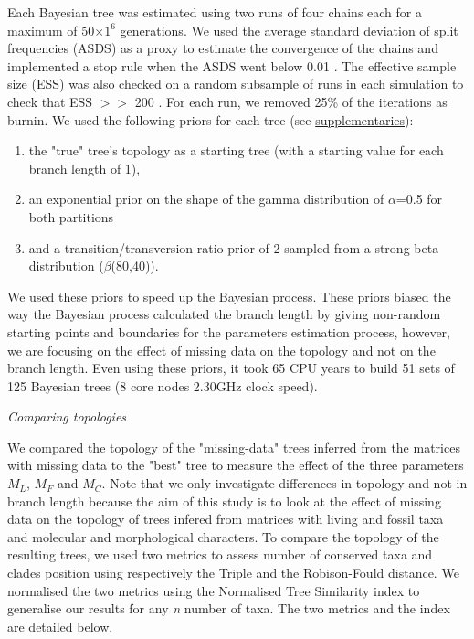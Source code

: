 \documentclass[12pt,letterpaper]{article}
\renewcommand{\subsection}[1]{%
\bigskip
\begin{center}
\begin{large}
\normalfont\itshape #1
\end{large}
\end{center}}
\begin{document}
Each Bayesian tree was estimated using two runs of four chains each for a maximum of 50$\times$$1^6$ generations.
We used the average standard deviation of split frequencies (ASDS) as a proxy to estimate the convergence of the chains and implemented a stop rule when the ASDS went below 0.01 \citep{Ronquist2012mrbayes}.
The effective sample size (ESS) was also checked on a random subsample of runs in each simulation to check that ESS $>>$ 200 \citep{drummond2006ess}.
For each run, we removed 25\% of the iterations as burnin. We used the following priors for each tree (see \hyperref[supplementaries]{supplementaries}):
\begin{enumerate}
\item
the "true" tree’s topology as a starting tree (with a starting value for each branch length of 1),
\item
an exponential prior on the shape of the gamma distribution of $\alpha$=0.5 for both partitions
\item
and a transition/transversion ratio prior of 2 sampled from a strong beta distribution ($\beta$(80,40)).
\end{enumerate}

We used these priors to speed up the Bayesian process.
These priors biased the way the Bayesian process calculated the branch length by giving non-random starting points and boundaries for the parameters estimation process, however, we are focusing on the effect of missing data on the topology and not on the branch length.
Even using these priors, it took 65 CPU years to build 51 sets of 125 Bayesian trees (8 core nodes 2.30GHz clock speed).

\subsection{Comparing topologies}
We compared the topology of the "missing-data" trees inferred from the matrices with missing data to the "best" tree to measure the effect of the three parameters $M_{L}$, $M_{F}$ and $M_{C}$.
Note that we only investigate differences in topology and not in branch length because the aim of this study is to look at the effect of missing data on the topology of trees infered from matrices with living and fossil taxa and molecular and morphological characters.
To compare the topology of the resulting trees, we used two metrics to assess number of conserved taxa and clades position using respectively the Triple \citep{dobson1975triplets} and the Robison-Fould \citep{RF1981} distance.
We normalised the two metrics using the Normalised Tree Similarity index \citep{Bogdanowicz2012} to generalise our results for any \textit{n} number of taxa. The two metrics and the index are detailed below.
\end{document}
